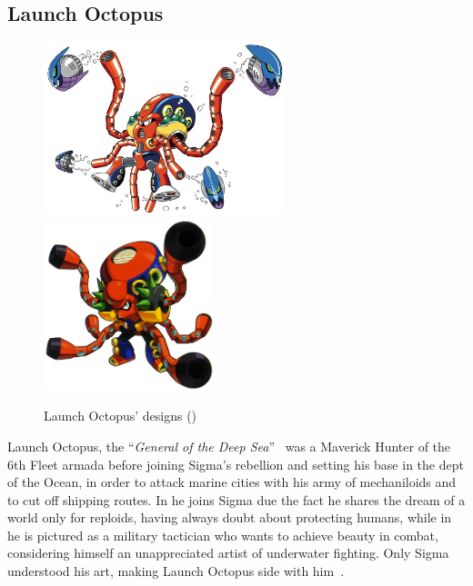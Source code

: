 \subsection{Launch Octopus}\label{boss:Launch_octopus}
\begin{figure}[htp]
	\centering
	\includegraphics[height=5cm]{figures/X1/Launch_octopus/LaunchOctopus.jpg}
	\includegraphics[height=5cm]{figures/X1/Launch_octopus/MHXLaunchOctopus.jpg}
	\caption{Launch Octopus' designs (\cite{book:MMX_Complete_art})}
\end{figure}

Launch Octopus, the ``\textit{General of the Deep Sea}''~\cite{book:MMX_Complete_art} was a Maverick Hunter of the 6th Fleet armada before joining Sigma's rebellion and setting his base in the dept of the Ocean, in order to attack marine cities with his army of mechaniloids and to cut off shipping routes. In \x he joins Sigma due the fact he shares the dream of a world only for reploids, having always doubt about protecting humans, while in \mhx he is pictured as a military tactician who wants to achieve beauty in combat, considering himself an unappreciated artist of underwater fighting. Only Sigma understood his art, making Launch Octopus side with him~\cite{wiki:MM_MHX_script}.

